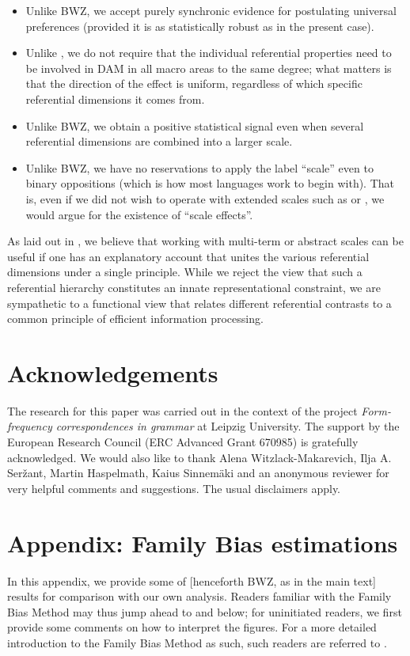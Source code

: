 \documentclass[output=paper]{langscibook}
\begin{document}
\begin{itemize}
\item Unlike BWZ, we accept purely synchronic evidence for postulating universal preferences (provided it is as statistically robust as in the present case).
\item Unlike \citet{Sinnemki2014Typological}, we do not require that the individual referential properties need to be involved in DAM in all macro areas to the same degree; what matters is that the direction of the effect is uniform, regardless of which specific referential dimensions it comes from.
\item Unlike BWZ, we obtain a positive statistical signal even when several referential dimensions are combined into a larger scale.
\item Unlike BWZ, we have no reservations to apply the label “scale” even to binary oppositions (which is how most languages work to begin with). That is, even if we did not wish to operate with extended scales such as  or , we would argue for the existence of “scale effects”.
\end{itemize}

As laid out in , we believe that working with multi-term or abstract scales can be useful if one has an explanatory account that unites the various referential dimensions under a single principle. While we reject the view that such a referential hierarchy constitutes an innate representational constraint, we are sympathetic to a functional view that relates different referential contrasts to a common principle of efficient information processing.

\section*{Acknowledgements}
The research for this paper was carried out in the context of the project \textit{Form-frequency correspondences in grammar} at Leipzig University. The support by the European Research Council (ERC Advanced Grant 670985) is gratefully acknowledged. We would also like to thank Alena Witzlack-Makarevich, Ilja A. Seržant, Martin Haspelmath, Kaius Sinnemäki and an anonymous reviewer for very helpful comments and suggestions. The usual disclaimers apply.

\largerpage
{\sloppy
\printbibliography[heading=subbibliography,notkeyword=this] }

\section*{Appendix:  Family Bias estimations}
In this appendix, we provide some of  [henceforth BWZ, as in the main text]  results for comparison with our own analysis. Readers familiar with the Family Bias Method may thus jump ahead to  and  below; for uninitiated readers, we first provide some comments on how to interpret the figures. For a more detailed introduction to the Family Bias Method as such, such readers are referred to \citet{Bickel2013Distributional}.
\end{document}
